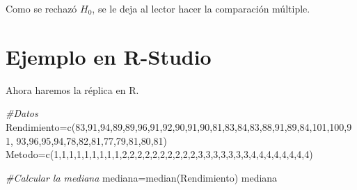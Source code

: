 \documentclass[
  a4paper,
  oneside,
  openany]{book}
\newenvironment{Shaded}{\begin{snugshade}}{\end{snugshade}}
\newcommand{\CommentTok}[1]{\textcolor[rgb]{0.56,0.35,0.01}{\textit{#1}}}
\newcommand{\DecValTok}[1]{\textcolor[rgb]{0.00,0.00,0.81}{#1}}
\newcommand{\FunctionTok}[1]{\textcolor[rgb]{0.00,0.00,0.00}{#1}}
\newcommand{\NormalTok}[1]{#1}
\newcommand{\OtherTok}[1]{\textcolor[rgb]{0.56,0.35,0.01}{#1}}
\begin{document}
Como se rechazó \(H_0\), se le deja al lector hacer la comparación múltiple.

\hypertarget{ejemplo-en-r-studio-12}{%
\section{Ejemplo en R-Studio}\label{ejemplo-en-r-studio-12}}

Ahora haremos la réplica en R.

\begin{Shaded}
\begin{Highlighting}[]
\CommentTok{\#Datos}
\NormalTok{Rendimiento}\OtherTok{=}\FunctionTok{c}\NormalTok{(}\DecValTok{83}\NormalTok{,}\DecValTok{91}\NormalTok{,}\DecValTok{94}\NormalTok{,}\DecValTok{89}\NormalTok{,}\DecValTok{89}\NormalTok{,}\DecValTok{96}\NormalTok{,}\DecValTok{91}\NormalTok{,}\DecValTok{92}\NormalTok{,}\DecValTok{90}\NormalTok{,}\DecValTok{91}\NormalTok{,}\DecValTok{90}\NormalTok{,}\DecValTok{81}\NormalTok{,}\DecValTok{83}\NormalTok{,}\DecValTok{84}\NormalTok{,}\DecValTok{83}\NormalTok{,}\DecValTok{88}\NormalTok{,}\DecValTok{91}\NormalTok{,}\DecValTok{89}\NormalTok{,}\DecValTok{84}\NormalTok{,}\DecValTok{101}\NormalTok{,}\DecValTok{100}\NormalTok{,}\DecValTok{91}\NormalTok{,}
              \DecValTok{93}\NormalTok{,}\DecValTok{96}\NormalTok{,}\DecValTok{95}\NormalTok{,}\DecValTok{94}\NormalTok{,}\DecValTok{78}\NormalTok{,}\DecValTok{82}\NormalTok{,}\DecValTok{81}\NormalTok{,}\DecValTok{77}\NormalTok{,}\DecValTok{79}\NormalTok{,}\DecValTok{81}\NormalTok{,}\DecValTok{80}\NormalTok{,}\DecValTok{81}\NormalTok{)}
\NormalTok{Metodo}\OtherTok{=}\FunctionTok{c}\NormalTok{(}\DecValTok{1}\NormalTok{,}\DecValTok{1}\NormalTok{,}\DecValTok{1}\NormalTok{,}\DecValTok{1}\NormalTok{,}\DecValTok{1}\NormalTok{,}\DecValTok{1}\NormalTok{,}\DecValTok{1}\NormalTok{,}\DecValTok{1}\NormalTok{,}\DecValTok{1}\NormalTok{,}\DecValTok{2}\NormalTok{,}\DecValTok{2}\NormalTok{,}\DecValTok{2}\NormalTok{,}\DecValTok{2}\NormalTok{,}\DecValTok{2}\NormalTok{,}\DecValTok{2}\NormalTok{,}\DecValTok{2}\NormalTok{,}\DecValTok{2}\NormalTok{,}\DecValTok{2}\NormalTok{,}\DecValTok{2}\NormalTok{,}\DecValTok{3}\NormalTok{,}\DecValTok{3}\NormalTok{,}\DecValTok{3}\NormalTok{,}\DecValTok{3}\NormalTok{,}\DecValTok{3}\NormalTok{,}\DecValTok{3}\NormalTok{,}\DecValTok{3}\NormalTok{,}\DecValTok{4}\NormalTok{,}\DecValTok{4}\NormalTok{,}\DecValTok{4}\NormalTok{,}\DecValTok{4}\NormalTok{,}\DecValTok{4}\NormalTok{,}\DecValTok{4}\NormalTok{,}\DecValTok{4}\NormalTok{,}\DecValTok{4}\NormalTok{)}

\CommentTok{\#Calcular la mediana}
\NormalTok{mediana}\OtherTok{=}\FunctionTok{median}\NormalTok{(Rendimiento)}
\NormalTok{mediana}
\end{Highlighting}
\end{Shaded}
\end{document}
